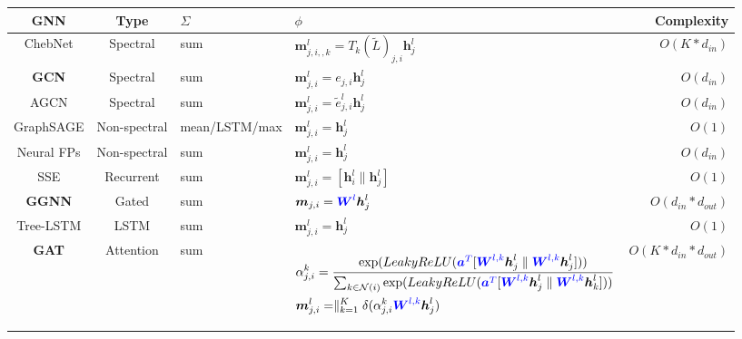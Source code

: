 \begin{table}
	\hspace{-10em}
    \begin{footnotesize}
        \begin{tabular}{ccp{8em}p{22em}r}
		\toprule
		GNN &
		Type &
		$\Sigma$ &
		$\phi$ &
		Complexity \\ \midrule
		ChebNet \cite{defferrad2016_chebnet} &
		Spectral &
		sum &
		$\boldsymbol{m}_{j, i, , k}^l = T_k(\widetilde{L} )_{j, i} \boldsymbol{h}_j^l$ &
		$O(K * d_{in})$ \\
		\textbf{GCN} &
		Spectral &
		sum &
		$\boldsymbol{m}_{j, i}^l = e_{j, i} \boldsymbol{h}_j^l$ &
		$O(d_{in})$ \\
		AGCN &
		Spectral &
		sum &
		$\boldsymbol{m}_{j, i}^l = \tilde{e}_{j, i}^l \boldsymbol{h}_j^l$ &
		$O(d_{in})$ \\
		GraphSAGE &
		Non-spectral &
		mean/LSTM/max &
		$\boldsymbol{m}_{j, i}^l =  \boldsymbol{h}_j^l$ &
		$O(1)$ \\
		Neural FPs &
		Non-spectral &
		sum &
		$\boldsymbol{m}_{j, i}^l = \boldsymbol{h}_j^l$ &
		$O(d_{in})$ \\
		SSE &
		Recurrent &
		sum &
		$\boldsymbol{m}_{j, i}^l = [\boldsymbol{h}_i^{l} \parallel \boldsymbol{h}_j^l]$ &
		$O(1)$ \\
		\textbf{GGNN} &
		Gated &
		sum &
		$\boldsymbol{m}_{j, i} = \textcolor{blue}{\boldsymbol{W}^l} \boldsymbol{h}_j^l$ &
		$O(d_{in} * d_{out})$ \\
		Tree-LSTM &
		LSTM &
		sum &
		$\boldsymbol{m}_{j, i}^l = \boldsymbol{h}_j^l$ &
		$O(1)$ \\
		\textbf{GAT}&
		Attention &
		sum  &
		\begin{scriptsize}
			$\begin{aligned}[t]
			& \alpha_{j, i}^k = \frac {\exp(LeakyReLU(\textcolor{blue}{\boldsymbol{a}^T} [ \textcolor{blue}{\boldsymbol{W}^{l,k}}  \boldsymbol{h}_j^l \parallel \textcolor{blue}{\boldsymbol{W}^{l,k}}  \boldsymbol{h}_j^l] ))} {\sum_{k \in \mathcal{N}(i)}\exp(LeakyReLU(\textcolor{blue}{\boldsymbol{a}^T} [ \textcolor{blue}{\boldsymbol{W}^{l,k}}  \boldsymbol{h}_j^l \parallel \textcolor{blue}{\boldsymbol{W}^{l,k}}  \boldsymbol{h}_k^l] ))} \\
			&  \boldsymbol{m}_{j, i}^l = \parallel_{k=1}^K \delta(\alpha_{j, i}^k \textcolor{blue}{\boldsymbol{W}^{l,k}} \boldsymbol{h}_j^{l})
			\end{aligned}$
		\end{scriptsize} &
		$O(K * d_{in} * d_{out})$ \\

\end{tabular}
\end{footnotesize}
\end{table}
